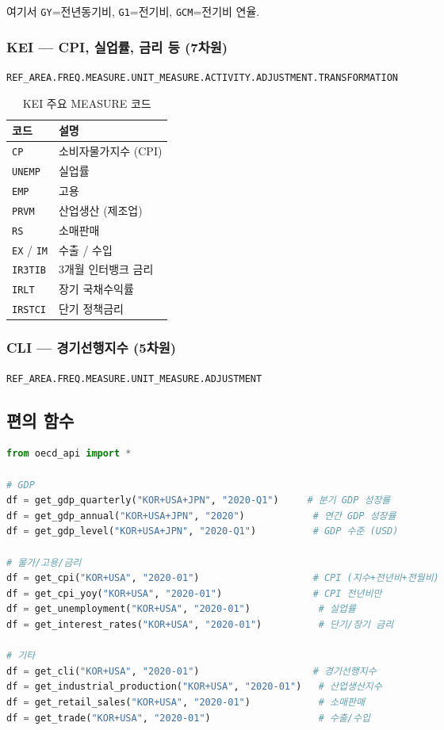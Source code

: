 \documentclass[11pt,a4paper]{article}
\newcommand{\apibox}[1]{%
    \noindent\colorbox{lightaccent}{\parbox{\dimexpr\textwidth-2\fboxsep}{%
        \small\texttt{#1}%
    }}%
    \vspace{0.5em}%
}
\newcommand{\code}[1]{\texttt{#1}}
\begin{document}
여기서 \code{GY}=전년동기비, \code{G1}=전기비, \code{GCM}=전기비 연율.

\subsubsection{KEI --- CPI, 실업률, 금리 등 (7차원)}

\apibox{REF\_AREA.FREQ.MEASURE.UNIT\_MEASURE.ACTIVITY.ADJUSTMENT.TRANSFORMATION}

\begin{table}[h]
\centering
\caption{KEI 주요 MEASURE 코드}
\begin{tabular}{l l}
\toprule
\textbf{코드} & \textbf{설명} \\
\midrule
\code{CP}     & 소비자물가지수 (CPI) \\
\code{UNEMP}  & 실업률 \\
\code{EMP}    & 고용 \\
\code{PRVM}   & 산업생산 (제조업) \\
\code{RS}     & 소매판매 \\
\code{EX} / \code{IM} & 수출 / 수입 \\
\code{IR3TIB} & 3개월 인터뱅크 금리 \\
\code{IRLT}   & 장기 국채수익률 \\
\code{IRSTCI} & 단기 정책금리 \\
\bottomrule
\end{tabular}
\end{table}

\subsubsection{CLI --- 경기선행지수 (5차원)}

\apibox{REF\_AREA.FREQ.MEASURE.UNIT\_MEASURE.ADJUSTMENT}

\subsection{편의 함수}

\begin{lstlisting}[language=Python]
from oecd_api import *

# GDP
df = get_gdp_quarterly("KOR+USA+JPN", "2020-Q1")     # 분기 GDP 성장률
df = get_gdp_annual("KOR+USA+JPN", "2020")            # 연간 GDP 성장률
df = get_gdp_level("KOR+USA+JPN", "2020-Q1")          # GDP 수준 (USD)

# 물가/고용/금리
df = get_cpi("KOR+USA", "2020-01")                    # CPI (지수+전년비+전월비)
df = get_cpi_yoy("KOR+USA", "2020-01")                # CPI 전년비만
df = get_unemployment("KOR+USA", "2020-01")            # 실업률
df = get_interest_rates("KOR+USA", "2020-01")          # 단기/장기 금리

# 기타
df = get_cli("KOR+USA", "2020-01")                    # 경기선행지수
df = get_industrial_production("KOR+USA", "2020-01")   # 산업생산지수
df = get_retail_sales("KOR+USA", "2020-01")            # 소매판매
df = get_trade("KOR+USA", "2020-01")                   # 수출/수입
\end{lstlisting}
\end{document}
